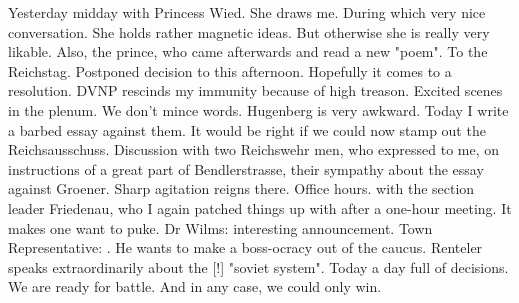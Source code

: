 Yesterday midday with Princess Wied. She draws me. During which very nice conversation. She holds rather magnetic ideas. But otherwise she is really very likable. Also, the prince, who came afterwards and read a new "poem". To the Reichstag. Postponed decision to this afternoon. Hopefully it comes to a resolution. DVNP rescinds my immunity because of high treason. Excited scenes in the plenum. We don't mince words. Hugenberg is very awkward. Today I write a barbed essay against them. It would be right if we could now stamp out the Reichsausschuss. Discussion with two Reichswehr men, who expressed to me, on instructions of a great part of Bendlerstrasse, their sympathy about the essay against Groener. Sharp agitation reigns there. Office hours.  with the section leader Friedenau, who I again patched things up with after a one-hour meeting. It makes one want to puke. Dr Wilms: interesting announcement. Town Representative: . He wants to make a boss-ocracy out of the caucus.  Renteler speaks extraordinarily about the [!] "soviet system". Today a day full of decisions. We are ready for battle. And in any case, we could only win.